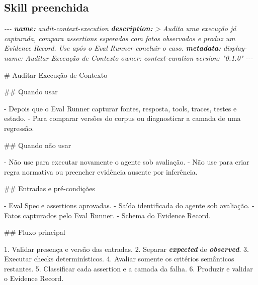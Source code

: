 \documentclass[
  10pt,
  a4paper,
  oneside]{book}
\newenvironment{Shaded}{}{}
\newcommand{\AnnotationTok}[1]{\textcolor[rgb]{0.38,0.63,0.69}{\textbf{\textit{#1}}}}
\newcommand{\CommentTok}[1]{\textcolor[rgb]{0.38,0.63,0.69}{\textit{#1}}}
\newcommand{\FunctionTok}[1]{\textcolor[rgb]{0.02,0.16,0.49}{#1}}
\newcommand{\InformationTok}[1]{\textcolor[rgb]{0.38,0.63,0.69}{\textbf{\textit{#1}}}}
\newcommand{\NormalTok}[1]{#1}
\newcommand{\SpecialStringTok}[1]{\textcolor[rgb]{0.73,0.40,0.53}{#1}}
\begin{document}
\hypertarget{skill-preenchida}{%
\subsection{Skill preenchida}\label{skill-preenchida}}

\begin{Shaded}
\begin{Highlighting}[]
\CommentTok{{-}{-}{-}}
\AnnotationTok{name:}\CommentTok{ audit{-}context{-}execution}
\AnnotationTok{description:}\CommentTok{ \textgreater{}}
\CommentTok{  Audita uma execução já capturada, compara assertions esperadas com fatos}
\CommentTok{  observados e produz um Evidence Record. Use após o Eval Runner concluir o caso.}
\AnnotationTok{metadata:}
\CommentTok{  display{-}name: Auditar Execução de Contexto}
\CommentTok{  owner: context{-}curation}
\CommentTok{  version: "0.1.0"}
\CommentTok{{-}{-}{-}}

\FunctionTok{\# Auditar Execução de Contexto}

\FunctionTok{\#\# Quando usar}

\SpecialStringTok{{-} }\NormalTok{Depois que o Eval Runner capturar fontes, resposta, tools, traces, testes e estado.}
\SpecialStringTok{{-} }\NormalTok{Para comparar versões do corpus ou diagnosticar a camada de uma regressão.}

\FunctionTok{\#\# Quando não usar}

\SpecialStringTok{{-} }\NormalTok{Não use para executar novamente o agente sob avaliação.}
\SpecialStringTok{{-} }\NormalTok{Não use para criar regra normativa ou preencher evidência ausente por inferência.}

\FunctionTok{\#\# Entradas e pré{-}condições}

\SpecialStringTok{{-} }\NormalTok{Eval Spec e assertions aprovadas.}
\SpecialStringTok{{-} }\NormalTok{Saída identificada do agente sob avaliação.}
\SpecialStringTok{{-} }\NormalTok{Fatos capturados pelo Eval Runner.}
\SpecialStringTok{{-} }\NormalTok{Schema do Evidence Record.}

\FunctionTok{\#\# Fluxo principal}

\SpecialStringTok{1. }\NormalTok{Validar presença e versão das entradas.}
\SpecialStringTok{2. }\NormalTok{Separar }\InformationTok{\textasciigrave{}expected\textasciigrave{}}\NormalTok{ de }\InformationTok{\textasciigrave{}observed\textasciigrave{}}\NormalTok{.}
\SpecialStringTok{3. }\NormalTok{Executar checks determinísticos.}
\SpecialStringTok{4. }\NormalTok{Avaliar somente os critérios semânticos restantes.}
\SpecialStringTok{5. }\NormalTok{Classificar cada assertion e a camada da falha.}
\SpecialStringTok{6. }\NormalTok{Produzir e validar o Evidence Record.}


\end{Highlighting}
\end{Shaded}
\end{document}
